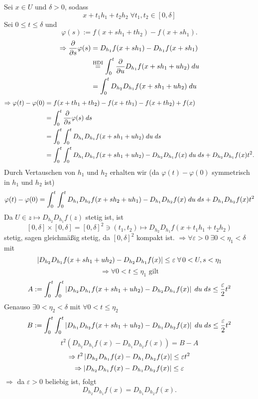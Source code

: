 \documentclass[../ana2.tex]{subfiles}
\begin{document}
\begin{bew}
    Sei \(x \in U\) und \(\delta > 0\), sodass 
    \[ x + t_1 h_1 + t_2h_2 \; \forall t_1, t_2 \in [0, \delta] \]    
    Sei \( 0 \leq t \leq \delta \) und 
    \[ \varphi(s) := f(x + s h_1 + t h_2) - f(x + s h_1). \]
    \begin{align*}
        \Rightarrow \ddxpartial{s} \varphi(s) 
        &= D_{h_1} f( x + sh_1 )- D_{h_1}f(x + s h_1) \\
        &\oversett{HDI}{=} \integralx{\ddxpartial{u} 
        D_{h_1}f(x+s h_1 + u h_2) }{0}{t}{u} \\
        &= \integralx{ D_{h_2} D_{h_1}f(x+s h_1 + u h_2) }{0}{t}{u} 
    \end{align*}
    \begin{align*}
        \Rightarrow \varphi(t)-\varphi(0) &= f(x+th_1+th_2)-f(x+th_1)
        -f(x+th_2) + f(x) \\
        &= \integralx{ \ddxpartial{s} \varphi(s)}{0}{t}{s}\\
        &= \integralx{
        \integralx{D_{h_1} D_{h_1} f(x + s h_1 + u h_2)}{0}{t}{u}
        }{0}{t}{s}\\
        &= \integralx{
            \integralx{D_{h_1} D_{h_1} f(x + s h_1 + u h_2) - D_{h_2} D_{h_1}f(x)}{0}{t}{u}
        }{0}{t}{s} + D_{h_2} D_{h_1} f(x) t^2.
    \end{align*}
    Durch Vertauschen von \(h_1\) und \(h_2\) erhalten wir 
    (da \(\varphi(t)-\varphi(0)\) symmetrisch in \(h_1\) und \(h_2\) ist)
    \[ \varphi(t)-\varphi(0) = \integralx{
        \integralx{D_{h_1} D_{h_2} f(x + s h_2 + u h_1) - D_{h_1} D_{h_2}f(x)}{0}{t}{u}
    }{0}{t}{s} + D_{h_1} D_{h_2} f(x) t^2 \]
    Da \( U \in z \mapsto D_{h_2} D_{h_1} f(z) \) stetig ist, ist 
    \[ [0,\delta]\times [0,\delta] = [0,\delta]^2 \ni (t_1, t_2) 
    \mapsto D_{h_2} D_{h_1} f(x + t_1 h_1 + t_2 h_2) \] 
    stetig, sagen gleichmäßig stetig, da \( [0,\delta]^2 \) kompakt ist.
    \( \Rightarrow \forall \varepsilon > 0 \; \exists 0 < \eta_1 < \delta \) mit
    \[ \abs{D_{h_2}D_{h_1} f(x+sh_1 + uh_2) - D_{h_2}D_{h_1}f(x)} \leq \varepsilon
    \; \forall 0 < U, s < \eta_1 \]    
    \[ \Rightarrow \forall 0 < t \leq \eta_1 \text{ gilt} \]
    \[ A := \integralx{
        \integralx{\abs{ D_{h_2} D_{h_1} f(x + s h_1 + u h_2) 
        - D_{h_2} D_{h_1} f(x) }}{0}{t}{u}
    }{0}{t}{s} \leq \frac{\varepsilon}{2}t^2 \]
    Genauso \(\exists 0 < \eta_2 < \delta \) mit \(\forall 0 < t \leq \eta_2\)
    \[ B := \integralx{
        \integralx{\abs{ D_{h_1} D_{h_2} f(x + s h_1 + u h_2) 
        - D_{h_1} D_{h_2} f(x) }}{0}{t}{u}
    }{0}{t}{s} \leq \frac{\varepsilon}{2}t^2 \]
    \[ t^2(D_{h_2}D_{h_1}f(x)-D_{h_1}D_{h_2}f(x)) = B - A \]
    \[ \Rightarrow t^2 \abs{ D_{h_2} D_{h_1} f(x) - D_{h_1} D_{h_2} f(x) } \leq \varepsilon t^2 \]
    \[ \Rightarrow \abs{ D_{h_2} D_{h_1} f(x) - D_{h_1} D_{h_2} f(x) } \leq \varepsilon \]
    \(\Rightarrow\) da \(\varepsilon > 0\) beliebig ist, folgt 
    \[ D_{h_2}D_{h_1}f(x) = D_{h_1}D_{h_2}f(x). \]
\end{bew}
\end{document}

